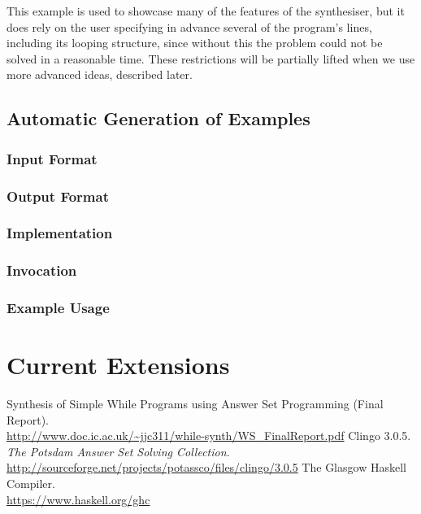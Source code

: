\documentclass[a4paper,twoside,notitlepage,12pt]{article}
\begin{document}
This example is used to showcase many of the features of the synthesiser, but 
it does rely on the user specifying in advance several of the program's lines, 
including its looping structure, since without this the problem could not be solved in 
a reasonable time. These restrictions will be partially lifted when we use more 
advanced ideas, described later.

\subsection{Automatic Generation of Examples} \label{sec:pgenx}

\subsubsection{Input Format}

\subsubsection{Output Format}

\subsubsection{Implementation}

\subsubsection{Invocation}

\subsubsection{Example Usage}

\clearpage
\section{Current Extensions}

\clearpage
\begin{thebibliography}{9}
        Synthesis of Simple While Programs using Answer Set Programming (Final Report). 
        \\ \url{http://www.doc.ic.ac.uk/~jjc311/while-synth/WS_FinalReport.pdf}
        Clingo 3.0.5. \emph{The Potsdam Answer Set Solving Collection.}
        \\ \url{http://sourceforge.net/projects/potassco/files/clingo/3.0.5}
        The Glasgow Haskell Compiler.
        \\ \url{https://www.haskell.org/ghc}
\end{thebibliography}
\end{document}

